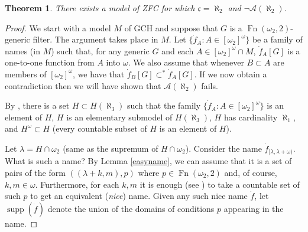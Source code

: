 \documentclass{amsart}
\theoremstyle{plain}
\newtheorem{theorem}{Theorem}
\theoremstyle{definition}
\theoremstyle{remark}
\theoremstyle{plain}
\theoremstyle{definition}
\theoremstyle{remark}
\begin{document}
            \begin{theorem} There exists a model of ZFC for which
             $\mathfrak c=\aleph_2$ and $\lnot \mathcal A(\aleph_2)$.
            \end{theorem}

            \begin{proof}
            We start with a model $M$ of GCH and suppose that $G$ is a
            $\operatorname{Fn}(\omega_2,2)$-generic filter. The argument takes
            place in $M$.
            Let $\{ \dot f_{A} : A\in [\omega_2]^\omega\}$ be a family of
            names (in $M$)
             such that, for any generic $G$ and each $A\in [\omega_2]^\omega\cap
             M$,
             $\dot f_{A}[G]$ is a one-to-one function from $A$ into
            $\omega$.  We also assume that whenever $B\subset A$ are members of
            $[\omega_2]^\omega$, we have that $\dot f_{B}[G]\subset^* \dot
            f_{A}[G]$. If we now obtain a contradiction
            then we will have shown that $\mathcal A(\aleph_2)$ fails.

            By \cite[1.5]{MR1031969}, there is a set $H\subset H(\aleph_3)$
            such that the family $\{ \dot f_{A} : A\in [\omega_2]^{\omega}\}$ is an
            element of $H$,  $H$ is an elementary submodel of
            $ H(\aleph_3)$, $H$ has cardinality
            $\aleph_1$, and $H^\omega\subset H$ (every
             countable subset of $H$ is an element of $H$).



            Let $\lambda = H\cap \omega_2$ (same as the supremum of $H\cap
            \omega_2$). Consider the name  $\dot f_{[\lambda,\lambda+\omega)}$.
            What is such a name?  By Lemma \ref{easyname},
            we can assume that it is a set of pairs
             of the form $( (\lambda+k,m), p)$ where $p\in \mathop{Fn}(\omega_2,
             2)$ and, of course, $k,m\in \omega$.
            Furthermore,  for each $k,m$ it is enough
            (see \cite[5.11,5.12]{MR597342})
            to take a  countable set of such $p$ to get an equivalent
            (\textit{nice}\/) name.
            Given any such nice name $\dot f$, let $\operatorname{supp}(\dot f)$
            denote the union of the domains of conditions $p$ appearing in the
            name.


\end{proof}
\end{document}
